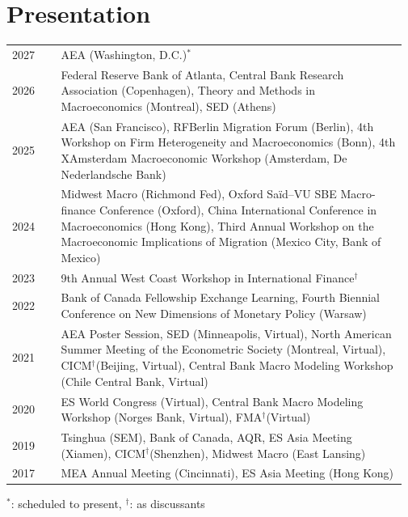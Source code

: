\documentclass[11pt]{article}
\begin{document}
\section{Presentation}
\newcommand{\scheduled}{$ ^{*} $}
\newcommand{\discussant}{$^{\dagger}$}
\begin{longtable}[l]{p{0.12\linewidth} p{0.85\linewidth}}
	2027 & AEA (Washington, D.C.)\scheduled \\
	2026 & Federal Reserve Bank of Atlanta, Central Bank Research Association (Copenhagen), Theory and Methods in Macroeconomics (Montreal), SED (Athens) \\
	2025 & AEA (San Francisco), RFBerlin Migration Forum (Berlin), 4th Workshop on Firm Heterogeneity and Macroeconomics (Bonn), 4th XAmsterdam Macroeconomic Workshop (Amsterdam, De Nederlandsche Bank) \\
	2024 & Midwest Macro (Richmond Fed), Oxford Saïd–VU SBE Macro-finance Conference (Oxford), China International Conference in Macroeconomics (Hong Kong), Third Annual Workshop on the Macroeconomic Implications of Migration (Mexico City, Bank of Mexico)  \\
	2023 & 9th Annual West Coast Workshop in International Finance\discussant \\
	2022 & Bank of Canada Fellowship Exchange Learning, Fourth Biennial Conference on New Dimensions of Monetary Policy (Warsaw)\\
	2021 & AEA Poster Session, SED (Minneapolis, Virtual), North American Summer Meeting of the Econometric Society (Montreal, Virtual), CICM\discussant (Beijing, Virtual), Central Bank Macro Modeling Workshop (Chile Central Bank, Virtual) \\
	2020 & ES World Congress (Virtual), Central Bank Macro Modeling Workshop (Norges Bank, Virtual), FMA\discussant (Virtual)\\
	2019 & Tsinghua (SEM), Bank of Canada, AQR, ES Asia Meeting (Xiamen), CICM\discussant (Shenzhen), Midwest Macro (East Lansing)\\
	2017 & MEA Annual Meeting (Cincinnati), ES Asia Meeting (Hong Kong) \\
\end{longtable}
\scheduled: scheduled to present, \discussant: as discussants 

\end{document}

